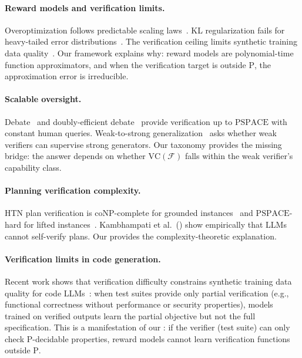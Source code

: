 \documentclass{article}
\theoremstyle{definition}
\theoremstyle{remark}
\newcommand{\PTIME}{\mathrm{P}}
\newcommand{\coNP}{\mathrm{coNP}}
\newcommand{\PSPACE}{\mathrm{PSPACE}}
\newcommand{\VC}{\mathrm{VC}}           %
\newcommand{\calF}{\mathcal{F}}         %
\begin{document}
\paragraph{Reward models and verification limits.}
Overoptimization follows predictable scaling laws~\citep{gao2023scaling,rafailov2024scaling}.
KL regularization fails for heavy-tailed error distributions~\citep{kwa2024catastrophic}.
The verification ceiling limits synthetic training data quality~\citep{verificationceiling2025}.
Our framework explains why: reward models are polynomial-time function approximators, and when the verification target is outside $\PTIME$, the approximation error is irreducible.

\paragraph{Scalable oversight.}
Debate~\citep{irving2018debate} and doubly-efficient debate~\citep{browncohen2024debate} provide verification up to $\PSPACE$ with constant human queries.
Weak-to-strong generalization~\citep{burns2023weak} asks whether weak verifiers can supervise strong generators.
Our taxonomy provides the missing bridge: the answer depends on whether $\VC(\calF)$ falls within the weak verifier's capability class.

\paragraph{Planning verification complexity.}
HTN plan verification is $\coNP$-complete for grounded instances~\citep{behnke2024verification} and $\PSPACE$-hard for lifted instances~\citep{behnke2025lifted}.
Kambhampati et al.~(\citeyear{kambhampati2024llms}) show empirically that LLMs cannot self-verify plans.
Our  provides the complexity-theoretic explanation.

\paragraph{Verification limits in code generation.}
Recent work shows that verification difficulty constrains synthetic training data quality for code LLMs~\citep{verificationceiling2025}: when test suites provide only partial verification (e.g., functional correctness without performance or security properties), models trained on verified outputs learn the partial objective but not the full specification. This is a manifestation of our : if the verifier (test suite) can only check $\PTIME$-decidable properties, reward models cannot learn verification functions outside $\PTIME$.
\end{document}
